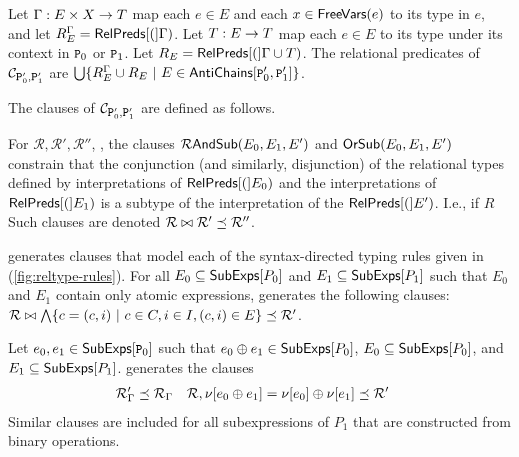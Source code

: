Let $\Gamma : E \times X \to T$ map each $e \in E$ and each
$x \in \mathsf{FreeVars}(e)$ to its type in $e$, and let $R_E^{\Gamma} =
\mathsf{RelPreds}[ ( ] \Gamma )$.
%
Let $T : E \to T$ map each $e \in E$ to its type under its
context in $\cc{P}_0$ or $\cc{P}_1$.
%
%
Let $R_E = \mathsf{RelPreds}[ ( ]\Gamma \cup T)$.
%
The relational predicates of $\mathcal{C}_{ \cc{P}_0', \cc{P}_1' }$
are $\bigunion \setformer{ R_E^{\Gamma} \union R_E }{ E \in
  \antichains{ \cc{P}_0' }{ \cc{P}_1' }}$.

The clauses of $\mathcal{C}_{ \cc{P}_0', \cc{P}_1' }$ are defined as
follows.
%

For $\mathcal{R}, \mathcal{R}', \mathcal{R}''$,
%
%
, the clauses $\mathcal{R}\mathsf{AndSub}(E_0, E_1, E')$ and $\mathsf{OrSub}(E_0, E_1,
E')$ constrain that the conjunction (and similarly, disjunction) of
the relational types defined by interpretations of $\mathsf{RelPreds}[ ( ]E_0)$
and the interpretations of $\mathsf{RelPreds}[ ( ]E_1)$ is a subtype of the
interpretation of the $\mathsf{RelPreds}[ ( ]E')$.
%
I.e., if $R$
%
%
Such clauses are denoted $\mathcal{R} \bowtie \mathcal{R}' \preceq
\mathcal{R}''$.


\verifybnd generates clauses that model each of the syntax-directed
typing rules given in (\autoref{fig:reltype-rules}).
For all $E_0 \subseteq \mathsf{SubExps}[  P_0  ]$ and $E_1 \subseteq \mathsf{SubExps}[ 
  P_1  ]$ such that $E_0$ and $E_1$ contain only atomic expressions,
\verifybnd generates the following clauses:
%
$\mathcal{R} \joinctr %
\bigland \setformer{ c = (c, i) }{ c \in \consts, i \in I, (c, i) \in E
} \subtype \mathcal{R}'$.

Let $e_0, e_1 \in \subexps{ \cc{P}_0 }$ such that $e_0 \oplus e_1
\in \mathsf{SubExps}[  P_0  ]$, %
$E_0 \subseteq \mathsf{SubExps}[  P_0  ]$, and %
$E_1 \subseteq \mathsf{SubExps}[  P_1  ]$.
%
\verifybnd generates the clauses
\begin{align*}
  \mathcal{R}'_{\Gamma} & \subtype \mathcal{R}_{\Gamma} &
  \mathcal{R}, %
  \resvar{e_0 \oplus e_1} = \resvar{e_0} \oplus \resvar{e_1} &
  \subtype \mathcal{R}'
\end{align*}
%
%
Similar clauses are included for all subexpressions of $P_1$ that are
constructed from binary operations.

